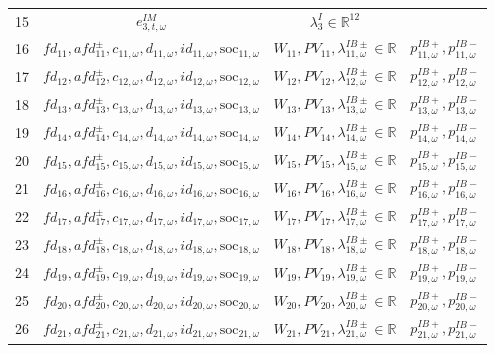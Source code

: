 \documentclass{article}
\newcommand{\R}{\mathbb{R}}
\newcommand{\soc}{\text{soc}}
\begin{document}
\begin{table}
\begin{tabular}{c c c c}
    15 & $e^{IM}_{3, t, \omega}$ & $\lambda^I_3 \in \R^{12}$ &  \\
	16 & $fd_{11}, afd^{\pm}_{11}, c_{11, \omega}, d_{11, \omega}, id_{11, \omega}, \soc_{11, \omega}$ & $W_{11}, PV_{11}, \lambda^{IB\pm}_{11, \omega} \in \R$ & $p^{IB+}_{11, \omega}, p^{IB-}_{11, \omega}$ \\
	17 & $fd_{12}, afd^{\pm}_{12}, c_{12, \omega}, d_{12, \omega}, id_{12, \omega}, \soc_{12, \omega}$ & $W_{12}, PV_{12}, \lambda^{IB\pm}_{12, \omega} \in \R$ & $p^{IB+}_{12, \omega}, p^{IB-}_{12, \omega}$ \\
	18 & $fd_{13}, afd^{\pm}_{13}, c_{13, \omega}, d_{13, \omega}, id_{13, \omega}, \soc_{13, \omega}$ & $W_{13}, PV_{13}, \lambda^{IB\pm}_{13, \omega} \in \R$ & $p^{IB+}_{13, \omega}, p^{IB-}_{13, \omega}$ \\
	19 & $fd_{14}, afd^{\pm}_{14}, c_{14, \omega}, d_{14, \omega}, id_{14, \omega}, \soc_{14, \omega}$ & $W_{14}, PV_{14}, \lambda^{IB\pm}_{14, \omega} \in \R$ & $p^{IB+}_{14, \omega}, p^{IB-}_{14, \omega}$ \\
	20 & $fd_{15}, afd^{\pm}_{15}, c_{15, \omega}, d_{15, \omega}, id_{15, \omega}, \soc_{15, \omega}$ & $W_{15}, PV_{15}, \lambda^{IB\pm}_{15, \omega} \in \R$ & $p^{IB+}_{15, \omega}, p^{IB-}_{15, \omega}$ \\
	21 & $fd_{16}, afd^{\pm}_{16}, c_{16, \omega}, d_{16, \omega}, id_{16, \omega}, \soc_{16, \omega}$ & $W_{16}, PV_{16}, \lambda^{IB\pm}_{16, \omega} \in \R$ & $p^{IB+}_{16, \omega}, p^{IB-}_{16, \omega}$ \\
	22 & $fd_{17}, afd^{\pm}_{17}, c_{17, \omega}, d_{17, \omega}, id_{17, \omega}, \soc_{17, \omega}$ & $W_{17}, PV_{17}, \lambda^{IB\pm}_{17, \omega} \in \R$ & $p^{IB+}_{17, \omega}, p^{IB-}_{17, \omega}$ \\
	23 & $fd_{18}, afd^{\pm}_{18}, c_{18, \omega}, d_{18, \omega}, id_{18, \omega}, \soc_{18, \omega}$ & $W_{18}, PV_{18}, \lambda^{IB\pm}_{18, \omega} \in \R$ &  $p^{IB+}_{18, \omega}, p^{IB-}_{18, \omega}$ \\
	24 & $fd_{19}, afd^{\pm}_{19}, c_{19, \omega}, d_{19, \omega}, id_{19, \omega}, \soc_{19, \omega}$ & $W_{19}, PV_{19}, \lambda^{IB\pm}_{19, \omega} \in \R$ & $p^{IB+}_{19, \omega}, p^{IB-}_{19, \omega}$ \\
	25 & $fd_{20}, afd^{\pm}_{20}, c_{20, \omega}, d_{20, \omega}, id_{20, \omega}, \soc_{20, \omega}$  & $W_{20}, PV_{20}, \lambda^{IB\pm}_{20, \omega} \in \R$ & $p^{IB+}_{20, \omega}, p^{IB-}_{20, \omega}$ \\
	26 &  $fd_{21}, afd^{\pm}_{21}, c_{21, \omega}, d_{21, \omega}, id_{21, \omega}, \soc_{21, \omega}$ & $W_{21}, PV_{21}, \lambda^{IB\pm}_{21, \omega} \in \R$ & $p^{IB+}_{21, \omega}, p^{IB-}_{21, \omega}$ \\

\end{tabular}
\end{table}
\end{document}
